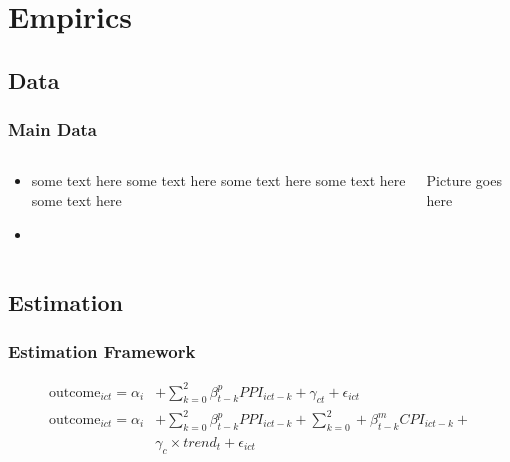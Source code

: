 \documentclass[11pt, aspectratio=169]{beamer}
\begin{document}
\section{Empirics}
\tableofcontents[currentsection,subsubsectionstyle=hide]
\subsection{Data}
\begin{frame}[label=data_slide]\frametitle{Main Data}

\begin{columns}
\begin{column}{0.6\textwidth}
\begin{itemize}
   \item some text here some text here some text here some text here some text here
   \item \hyperlink{appendix_end}{}
\end{itemize}
\end{column}
\begin{column}{0.4\textwidth}
    \begin{center}
    Picture goes here
     \end{center}
\end{column}
\end{columns}

\end{frame}


\subsection{Estimation}
\begin{frame}\frametitle{Estimation Framework}

\begin{align*}
\text{outcome}_{ict} = \alpha_i & + \sum_{k=0}^2 \beta_{t-k}^p
PPI_{ict-k} + \gamma_{ct} + \epsilon_{ict} \\
\text{outcome}_{ict} = \alpha_i & + \sum_{k=0}^2 \beta_{t-k}^p PPI_{ict-k} +
\sum_{k=0}^2 + \beta_{t-k}^m CPI_{ict-k} + \\ & \gamma_{c}\times
trend_t + \epsilon_{ict}
\end{align*}

\end{frame}

\end{document}
